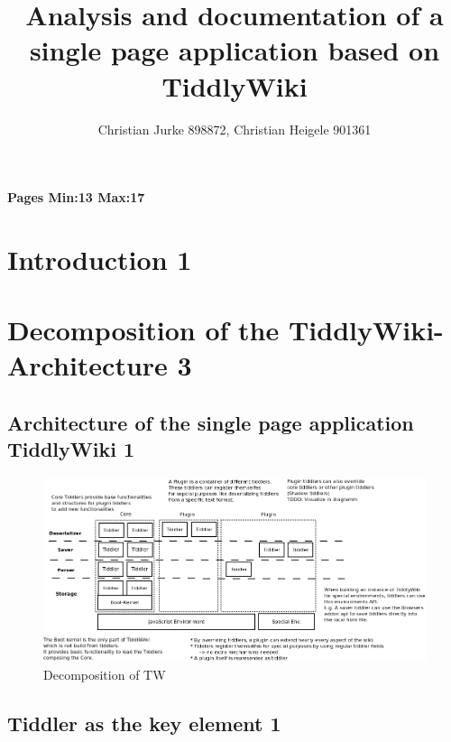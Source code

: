 \documentclass[12pt,a4paper]{article}
\title{Analysis and documentation of a single page application based on TiddlyWiki}
\author{Christian Jurke 898872, Christian Heigele 901361}
\begin{document}
\maketitle
\tableofcontents
\textbf{Pages Min:13 Max:17 }
\section{Introduction 1}
\section{Decomposition of the TiddlyWiki-Architecture 3}
\subsection{Architecture of the single page application TiddlyWiki 1}
\begin{figure}[hbtp]
\includegraphics[scale=0.4]{images/overview.png}
\caption{Decomposition of TW}
\end{figure}

\subsection{Tiddler as the key element 1}
\newpage
\end{document}

